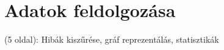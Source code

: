 
\section{Adatok feldolgozása}
(5 oldal): Hibák kiszűrése, gráf reprezentálás, statisztikák
\citep{traceParse}